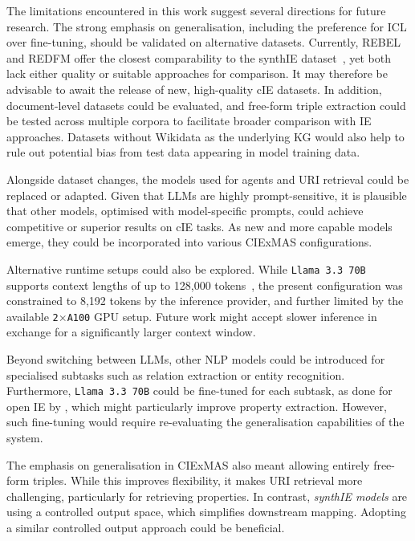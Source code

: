 \documentclass[a4paper,oneside,bibliography=totoc]{scrbook}
\begin{document}
The limitations encountered in this work suggest several directions for future research. The strong emphasis on generalisation, including the preference for \ac{ICL} over fine-tuning, should be validated on alternative datasets. Currently, REBEL and REDFM offer the closest comparability to the synthIE dataset~\cite{HuguetCabot2021,Cabot2023}, yet both lack either quality or suitable approaches for comparison. It may therefore be advisable to await the release of new, high-quality \ac{cIE} datasets. In addition, document-level datasets could be evaluated, and free-form triple extraction could be tested across multiple corpora to facilitate broader comparison with \ac{IE} approaches. Datasets without Wikidata as the underlying \ac{KG} would also help to rule out potential bias from test data appearing in model training data.

Alongside dataset changes, the models used for agents and \ac{URI} retrieval could be replaced or adapted. Given that \acp{LLM} are highly prompt-sensitive, it is plausible that other models, optimised with model-specific prompts, could achieve competitive or superior results on \ac{cIE} tasks. As new and more capable models emerge, they could be incorporated into various CIExMAS configurations.

Alternative runtime setups could also be explored. While \texttt{Llama 3.3 70B} supports context lengths of up to 128{,}000 tokens~\cite{Meta2024}, the present configuration was constrained to 8{,}192 tokens by the inference provider, and further limited by the available \texttt{2$\times$A100} GPU setup. Future work might accept slower inference in exchange for a significantly larger context window.

Beyond switching between \acp{LLM}, other \ac{NLP} models could be introduced for specialised subtasks such as relation extraction or entity recognition. Furthermore, \texttt{Llama 3.3 70B} could be fine-tuned for each subtask, as done for open \ac{IE} by \citet{Xue2024}, which might particularly improve property extraction. However, such fine-tuning would require re-evaluating the generalisation capabilities of the system.

The emphasis on generalisation in CIExMAS also meant allowing entirely free-form triples. While this improves flexibility, it makes \ac{URI} retrieval more challenging, particularly for retrieving properties. In contrast, \textit{synthIE models} are using a controlled output space, which simplifies downstream mapping. Adopting a similar controlled output approach could be beneficial.
\end{document}
